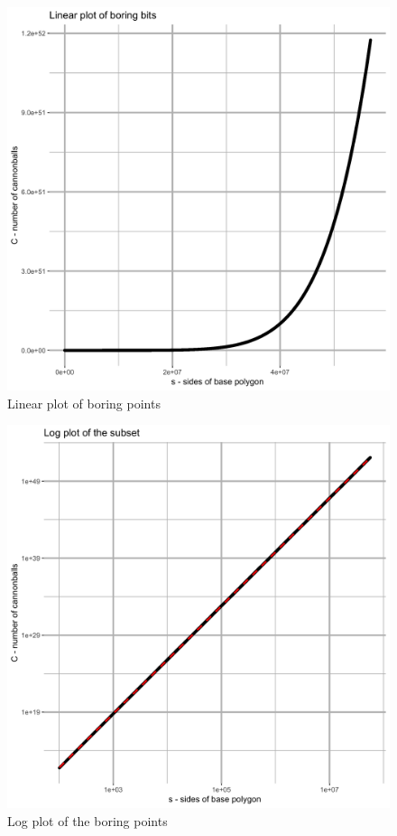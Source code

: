 \begin{figure}[H]
\centering
\includegraphics[width=\textwidth]{../graph/boring_lin.png}
\caption{Linear plot of boring points}
\label{fig_linear_boring}
\end{figure}

\begin{figure}[H]
\centering
\includegraphics[width=\textwidth]{../graph/boring_log.png}
\caption{Log plot of the boring points}
\label{fig_log_boring}
\end{figure}

